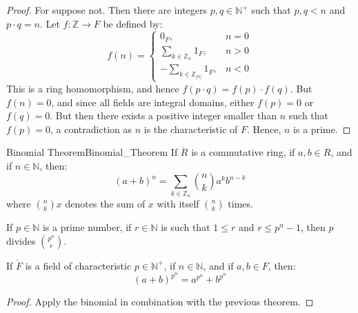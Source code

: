     \begin{proof}
        For suppose not. Then there are integers $p,q\in\mathbb{N}^{+}$ such
        that $p,q<n$ and $p\cdot{q}=n$. Let $f:\mathbb{Z}\rightarrow{F}$ be
        defined by:
        \begin{equation}
            f(n)=
            \begin{cases}
                0_{F},&n=0\\
                \sum_{k\in\mathbb{Z}_{n}}1_{F},&n>0\\
                \minus\sum_{k\in\mathbb{Z}_{|n|}}1_{F},&n<0
            \end{cases}
        \end{equation}
        This is a ring homomorphism, and hence
        $f(p\cdot{q})=f(p)\cdot{f}(q)$. But $f(n)=0$, and since all fields
        are integral domains, either $f(p)=0$ or $f(q)=0$. But then there
        exists a positive integer smaller than $n$ such that $f(p)=0$,
        a contradiction as $n$ is the characteristic of $F$. Hence, $n$ is
        a prime.
    \end{proof}
    \begin{ftheorem}{Binomial Theorem}{Binomial_Theorem}
        If $\ring{R}$ is a commutative ring, if $a,b\in{R}$, and if
        $n\in\mathbb{N}$, then:
        \begin{equation*}
            (a+b)^{n}=\sum_{k\in\mathbb{Z}_{n}}\binom{n}{k}a^{k}b^{n-k}
        \end{equation*}
        where $\binom{n}{k}x$ denotes the sum of $x$ with itself
        $\binom{n}{k}$ times.
    \end{ftheorem}
    \begin{theorem}
        If $p\in\mathbb{N}$ is a prime number, if $r\in\mathbb{N}$ is such
        that $1\leq{r}$ and $r\leq{p}^{n}-1$, then $p$ divides
        $\binom{p^{n}}{r}$.
    \end{theorem}
    \begin{theorem}
        If $\ring{F}$ is a field of characteristic $p\in\mathbb{N}^{+}$,
        if $n\in\mathbb{N}$, and if $a,b\in{F}$, then:
        \begin{equation}
            (a+b)^{p^{n}}=a^{p^{n}}+b^{p^{n}}
        \end{equation}
    \end{theorem}
    \begin{proof}
        Apply the binomial in combination with the previous theorem.
    \end{proof}
